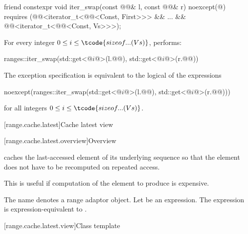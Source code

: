%
\begin{itemdecl}
friend constexpr void iter_swap(const @@& l, const @@& r) noexcept(@\seebelow@)
  requires (@@<iterator_t<@@<Const, First>>> && ... &&
        @@<iterator_t<@@<Const, Vs>>>);
\end{itemdecl}

\begin{itemdescr}
\pnum
\effects
For every integer $0 \le i \le \tcode{sizeof...(Vs)}$, performs:
\begin{codeblock}
ranges::iter_swap(std::get<@$i$@>(l.@@), std::get<@$i$@>(r.@@))
\end{codeblock}

\pnum
\remarks
The exception specification is equivalent to the logical  of the expressions
\begin{codeblock}
noexcept(ranges::iter_swap(std::get<@$i$@>(l.@@), std::get<@$i$@>(r.@@)))
\end{codeblock}
for all integers $0 \le i \le \tcode{sizeof...(Vs)}$.
\end{itemdescr}

[range.cache.latest]{Cache latest view}

[range.cache.latest.overview]{Overview}

\pnum
{} caches the last-accessed element of
its underlying sequence
so that the element does not have to be recomputed on repeated access.
\begin{note}
This is useful if computation of the element to produce is expensive.
\end{note}

\pnum
The name  denotes
a range adaptor object.
Let  be an expression.
The expression  is expression-equivalent to
.

[range.cache.latest.view]{Class template }

